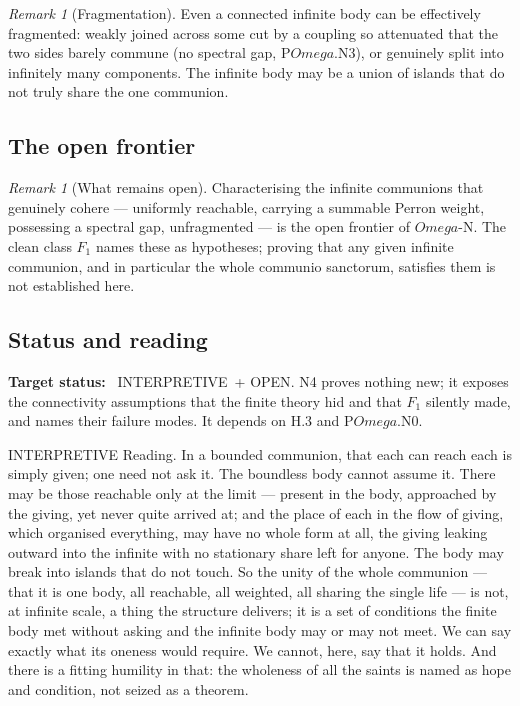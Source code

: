 \documentclass[11pt,a4paper]{article}
\def\Omega{Omega}%
\def\mathfrak#1{#1}%
\def\emph#1{#1}%
\newcommand{\stInterp}{\textcolor{cInt}{\textsf{\small INTERPRETIVE}}}
\newcommand{\stOpen}{\textcolor{cOpn}{\textsf{\small OPEN}}}
\theoremstyle{definition}
\theoremstyle{plain}
\theoremstyle{remark}
\newtheorem{remark}[definition]{Remark}
\begin{document}
\begin{remark}[Fragmentation]\label{rem:fragment}
Even a connected infinite body can be effectively fragmented: weakly joined across some cut by a
coupling so attenuated that the two sides barely commune (no spectral gap, P$\Omega$.N3), or
genuinely split into infinitely many components. The infinite body may be a union of islands
that do not truly share the one communion.
\end{remark}

\subsection{The open frontier}

\begin{remark}[What remains open]\label{rem:nfrontier}
Characterising the infinite communions that genuinely cohere --- uniformly reachable,
carrying a summable Perron weight, possessing a spectral gap, unfragmented --- is the open
frontier of $\Omega$-N. The clean class \(\mathfrak F_1\) names these as hypotheses; proving that
any given infinite communion, and in particular the whole \emph{communio sanctorum}, satisfies
them is not established here.
\end{remark}

\subsection{Status and reading}

\textbf{Target status:}~
\stInterp\ + \stOpen. N4 proves nothing new; it exposes the connectivity assumptions that the
finite theory hid and that \(\mathfrak F_1\) silently made, and names their failure modes. It
depends on H.3 and P$\Omega$.N0.

\medskip
\stInterp\quad
\emph{Reading.}
In a bounded communion, that each can reach each is simply given; one need not ask it. The
boundless body cannot assume it. There may be those reachable only at the limit --- present in
the body, approached by the giving, yet never quite arrived at; and the place of each in the
flow of giving, which organised everything, may have no whole form at all, the giving leaking
outward into the infinite with no stationary share left for anyone. The body may break into
islands that do not touch. So the unity of the whole communion --- that it is one body, all
reachable, all weighted, all sharing the single life --- is not, at infinite scale, a thing the
structure delivers; it is a set of conditions the finite body met without asking and the
infinite body may or may not meet. We can say exactly what its oneness would require. We cannot,
here, say that it holds. And there is a fitting humility in that: the wholeness of all the saints
is named as hope and condition, not seized as a theorem.
\end{document}
